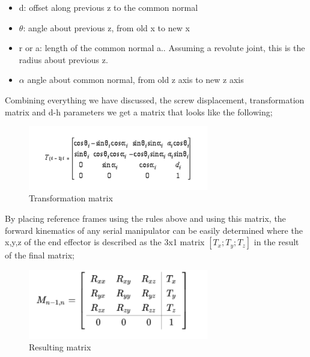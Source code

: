     \begin{itemize}
        \item d: offset along previous  z to the common normal
        \item $\theta$: angle about previous z, from old x to new x
        \item r or a: length of the common normal a.. Assuming a revolute joint, this is the radius about previous z.
        \item $\alpha$ angle about common normal, from old z axis to new z axis
    \end{itemize}
    Combining everything we have discussed, the screw displacement, transformation matrix and d-h parameters we get a matrix that looks like the following;
     \begin{figure}[H]
        \centering
        \includegraphics[width=0.7\textwidth]{Matrizx.PNG}
        \caption{Transformation matrix}
        \label{fig:my_label}
    \end{figure}
    By placing reference frames using the rules above and using this matrix, the forward kinematics of any serial manipulator can be easily determined where the x,y,z of the end effector is described as the 3x1 matrix $[T_x; T_y; T_z]$ in the result of the final matrix; 
     \begin{figure}[H]
        \centering
        \includegraphics[width=0.7\textwidth]{Matrix2.PNG}
        \caption{Resulting matrix}
        \label{fig:my_label}
    \end{figure}



